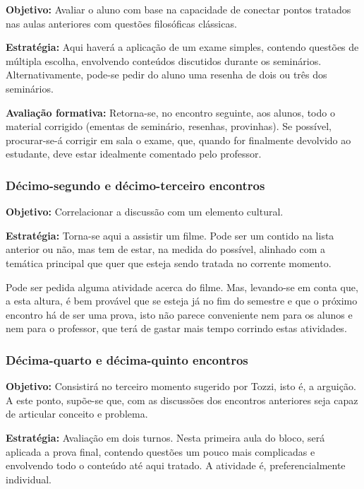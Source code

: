 \documentclass[12pt,a4paper]{article}
\newenvironment{citac}{
	\begin{addmargin}[4cm]{1em} \footnotesize}{\normalfont \end{addmargin}
}
\begin{document}
\begin{citac}
	\textbf{Objetivo:} Avaliar o aluno com base na capacidade de 
	conectar pontos tratados nas aulas anteriores com questões 
	filosóficas clássicas. 

	\textbf{Estratégia:}
	Aqui haverá a aplicação de um exame simples, contendo questões 
	de múltipla escolha, envolvendo conteúdos discutidos durante os 
	seminários. Alternativamente, pode-se pedir do aluno uma resenha 
	de dois ou três dos seminários. 
	
	\textbf{Avaliação formativa:}
	Retorna-se, no encontro seguinte, aos alunos, todo o material 
	corrigido (ementas de seminário, resenhas, provinhas). Se possível, 
	procurar-se-á corrigir em sala o exame, que, quando for finalmente 
	devolvido ao estudante, deve estar idealmente comentado 
	pelo professor. 
	
	\subsubsection{Décimo-segundo e décimo-terceiro encontros}

	\textbf{Objetivo:} Correlacionar a discussão com um elemento cultural. 

	\textbf{Estratégia:}
	Torna-se aqui a assistir um filme. Pode ser um contido na 
	lista anterior ou não, mas tem de estar, na medida do possível, 
	alinhado com a temática principal que quer que esteja sendo 
	tratada no corrente momento. 
	
	Pode ser pedida alguma atividade acerca do filme. Mas, 
	levando-se em conta que, a esta altura, é bem provável que se esteja 
	já no fim do semestre e que o próximo encontro há de ser uma prova, 
	isto não parece conveniente nem para os alunos e nem para o professor, 
	que terá de gastar mais tempo corrindo estas atividades. 
	
	\subsubsection{Décima-quarto e décima-quinto encontros}
	
	\textbf{Objetivo:} Consistirá no terceiro momento sugerido por Tozzi, 
	isto é, a arguição. A este ponto, supõe-se que, com as discussões dos 
	encontros anteriores seja capaz de articular conceito e problema. 

	\textbf{Estratégia:}
	Avaliação em dois turnos. Nesta primeira aula do bloco, será aplicada 
	a prova final, contendo questões um pouco mais complicadas e 
	envolvendo todo o conteúdo até aqui tratado. A atividade é, 
	preferencialmente individual. 
	

\end{citac}
\end{document}
